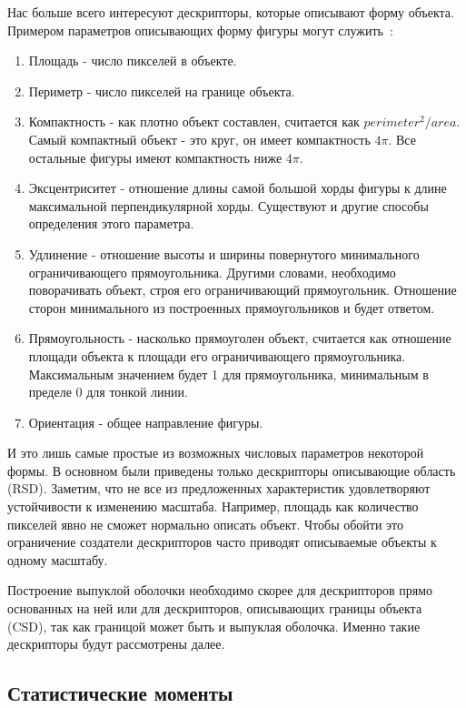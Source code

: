 Нас больше всего интересуют дескрипторы, которые описывают форму объекта. Примером параметров описывающих форму фигуры могут служить~\cite{morse2000lecture}:
\begin{enumerate}
	\item Площадь - число пикселей в объекте.
	\item Периметр - число пикселей на границе объекта.
	\item Компактность - как плотно объект составлен, считается как $perimeter^2/area$. Самый компактный объект - это круг, он имеет компактность $4\pi$. Все остальные фигуры имеют компактность ниже $4\pi$.
	\item Эксцентриситет - отношение длины самой большой хорды фигуры к длине максимальной перпендикулярной хорды. Существуют и другие способы определения этого параметра.
	\item Удлинение - отношение высоты и ширины повернутого минимального ограничивающего прямоугольника. Другими словами, необходимо поворачивать объект, строя его ограничивающий прямоугольник. Отношение сторон минимального из построенных прямоугольников и будет ответом.
	\item Прямоугольность - насколько прямоуголен объект, считается как отношение площади объекта к площади его ограничивающего прямоугольника. Максимальным значением будет 1 для прямоугольника, минимальным в пределе 0 для тонкой линии.
	\item Ориентация - общее направление фигуры.
\end{enumerate}

И это лишь самые простые из возможных числовых параметров некоторой формы. В основном были приведены только дескрипторы описывающие область (RSD). Заметим, что не все из предложенных характеристик удовлетворяют устойчивости к изменению масштаба. Например, площадь как количество пикселей явно не сможет нормально описать объект. Чтобы обойти это ограничение создатели дескрипторов часто приводят описываемые объекты к одному масштабу.

Построение выпуклой оболочки необходимо скорее для дескрипторов прямо основанных на ней \cite{mathew2015content} или для дескрипторов, описывающих границы объекта (CSD), так как границой может быть и выпуклая оболочка. Именно такие дескрипторы будут рассмотрены далее.

\subsection{Статистические моменты}

